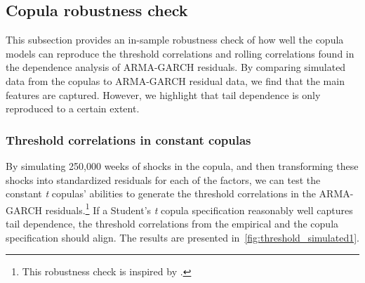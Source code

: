 \subsection{Copula robustness check}
\label{sub:05_robust}

This subsection provides an in-sample robustness check of how well the copula models can reproduce the threshold correlations and rolling correlations found in the dependence analysis of ARMA-GARCH residuals. By comparing simulated data from the copulas to ARMA-GARCH residual data, we find that the main features are captured. However, we highlight that tail dependence is only reproduced to a certain extent.

\subsubsection{Threshold correlations in constant copulas}
By simulating 250,000 weeks of shocks in the copula, and then transforming these shocks into standardized residuals for each of the factors, we can test the constant \textit{t} copulas' abilities to generate the threshold correlations in the ARMA-GARCH residuals.\footnote{This robustness check is inspired by \textcite{ChristoffersenLanglois2013}.} If a Student's \textit{t} copula specification reasonably well captures tail dependence, the threshold correlations from the empirical and the copula specification should align. The results are presented in~\autoref{fig:threshold_simulated1}.

